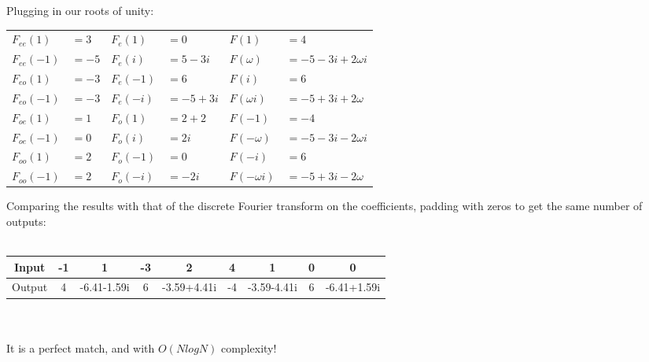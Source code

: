 \documentclass{beamer}
\begin{document}
\begin{frame}
  Plugging in our roots of unity:
  \begin{center}
    \begin{tabular}{ll | ll | ll}
      $F_{ee}(1)$  & $= 3$  & $F_e(1)$  & $= 0$       & $F(1)$         & $= 4$                    \\
      $F_{ee}(-1)$ & $= -5$ & $F_e(i)$  & $= 5 - 3i$  & $F(\omega)$    & $= - 5 - 3i + 2\omega i$ \\
      $F_{eo}(1)$  & $= -3$ & $F_e(-1)$ & $= 6$       & $F(i)$         & $= 6$                    \\
      $F_{eo}(-1)$ & $= -3$ & $F_e(-i)$ & $= -5 + 3i$ & $F(\omega i)$  & $= - 5 + 3i + 2\omega$   \\
      $F_{oe}(1)$  & $= 1$  & $F_o(1)$  & $= 2 + 2$   & $F(-1)$        & $= -4$                   \\
      $F_{oe}(-1)$ & $= 0$  & $F_o(i)$  & $= 2i$      & $F(-\omega)$   & $= - 5 - 3i - 2\omega i$ \\
      $F_{oo}(1)$  & $= 2$  & $F_o(-1)$ & $= 0$       & $F(-i)$        & $= 6$                    \\
      $F_{oo}(-1)$ & $= 2$  & $F_o(-i)$ & $= -2i$     & $F(-\omega i)$ & $= - 5 + 3i - 2\omega$   \\
    \end{tabular}
  \end{center}
\end{frame}

\begin{frame}
  Comparing the results with that of the discrete Fourier transform on the coefficients, padding with zeros to get the same number of outputs:\\~\\
  \begin{adjustbox}{width = \textwidth}
    \begin{tabular}{ |c|c|c|c|c|c|c|c|c| }
      \hline
      Input  & -1 & 1           & -3 & 2           & 4  & 1           & 0 & 0           \\
      \hline
      Output & 4  & -6.41-1.59i & 6  & -3.59+4.41i & -4 & -3.59-4.41i & 6 & -6.41+1.59i \\
      \hline
    \end{tabular}
  \end{adjustbox}\\~\\
  It is a perfect match, and with $O(NlogN)$ complexity!
\end{frame}
\end{document}
